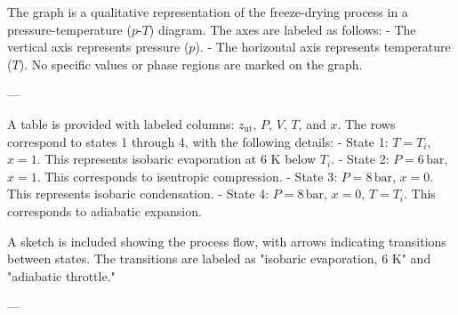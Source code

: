 The graph is a qualitative representation of the freeze-drying process in a pressure-temperature (\( p \)-\( T \)) diagram. The axes are labeled as follows:  
- The vertical axis represents pressure (\( p \)).  
- The horizontal axis represents temperature (\( T \)).  
No specific values or phase regions are marked on the graph.

---

A table is provided with labeled columns: \( z_{\text{ut}} \), \( P \), \( V \), \( T \), and \( x \). The rows correspond to states 1 through 4, with the following details:  
- State 1: \( T = T_i \), \( x = 1 \). This represents isobaric evaporation at 6 K below \( T_i \).  
- State 2: \( P = 6 \, \text{bar} \), \( x = 1 \). This corresponds to isentropic compression.  
- State 3: \( P = 8 \, \text{bar} \), \( x = 0 \). This represents isobaric condensation.  
- State 4: \( P = 8 \, \text{bar} \), \( x = 0 \), \( T = T_i \). This corresponds to adiabatic expansion.  

A sketch is included showing the process flow, with arrows indicating transitions between states. The transitions are labeled as "isobaric evaporation, 6 K" and "adiabatic throttle."

---